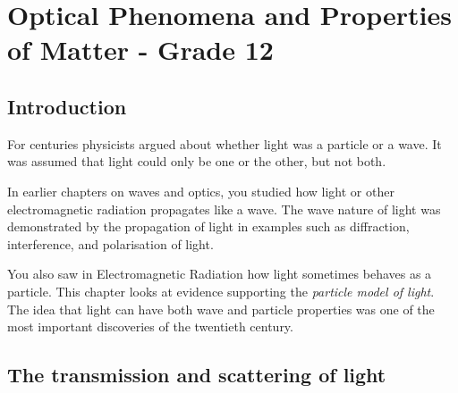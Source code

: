 



\chapter{Optical Phenomena and Properties of Matter - Grade 12}
\label{p:mm:op12}



\section {Introduction}
For centuries physicists argued about whether light was a particle or a wave. It was assumed that light could only be one or the other, but not both.
 

In earlier chapters on waves and optics, you studied how light or other electromagnetic radiation propagates like a wave. The wave nature of light was demonstrated by the propagation of light in examples such as diffraction, interference, and polarisation of light.

 
You also saw in Electromagnetic Radiation how light sometimes behaves as a particle. This chapter looks at evidence supporting the \textit{particle model of light}. The idea that light can have both wave and particle properties was one of the most important discoveries of the twentieth century.

\section{The transmission and scattering of light}

